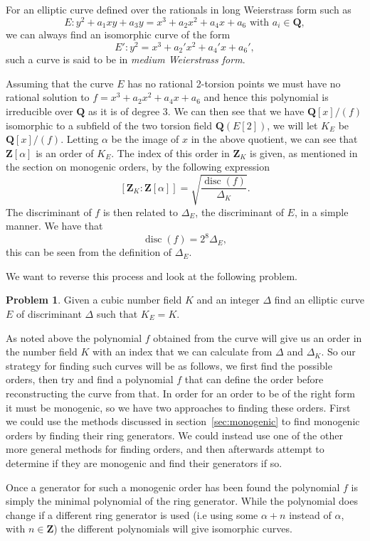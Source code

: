 \documentclass[12pt,a4paper,abstracton,bibtotoc]{scrreprt}
\theoremstyle{definition}
\newtheorem{prob}{Problem}
\newcommand{\QQ}{\mathbf{Q}}
\newcommand{\ZZ}{\mathbf{Z}}
\DeclareMathOperator{\disc}{disc}
\begin{document}
For an elliptic curve defined over the rationals in long Weierstrass form such as
\[
E \colon y^2 + a_1xy + a_3y = x^3 + a_2x^2 + a_4x + a_6\text{ with }a_i \in \QQ,
\]
we can always find an isomorphic curve of the form
\[
E' \colon y^2 = x^3 + a_2'x^2 + a_4'x + a_6',
\]
such a curve is said to be in \emph{medium Weierstrass form}.

\minisec{}
Assuming that the curve $E$ has no rational 2-torsion points we must have no rational solution to $f = x^3 + a_2x^2 + a_4x + a_6$ and hence this polynomial is irreducible over $\QQ$ as it is of degree 3.
We can then see that we have $\QQ[x]/(f)$ isomorphic to a subfield of the two torsion field $\QQ(E[2])$, we will let $K_E$ be $\QQ[x]/(f)$.
Letting $\alpha$ be the image of $x$ in the above quotient, we can see that $\ZZ[\alpha]$ is an order of $K_E$.
The index of this order in $\ZZ_K$ is given, as mentioned in the section on monogenic orders, by the following expression
\[
[\ZZ_K:\ZZ[\alpha]] = \sqrt{\frac{\disc(f)}{\Delta_K}}.
\]
The discriminant of $f$ is then related to $\Delta_E$, the discriminant of $E$, in a simple manner.
We have that
\[
\disc(f) = 2^8 \Delta_E,
\]
this can be seen from the definition of $\Delta_E$. %

We want to reverse this process and look at the following problem.

\begin{prob}
Given a cubic number field $K$ and an integer $\Delta$ find an elliptic curve $E$ of discriminant $\Delta$ such that $K_E = K$.
\end{prob}

As noted above the polynomial $f$ obtained from the curve will give us an order in the number field $K$ with an index that we can calculate from $\Delta$ and $\Delta_K$.
So our strategy for finding such curves will be as follows, we first find the possible orders, then try and find a polynomial $f$ that can define the order before reconstructing the curve from that.
In order for an order to be of the right form it must be monogenic, so we have two approaches to finding these orders.
First we could use the methods discussed in section~\ref{sec:monogenic} to find monogenic orders by finding their ring generators.
We could instead use one of the other more general methods for finding orders, and then afterwards attempt to determine if they are monogenic and find their generators if so.

Once a generator for such a monogenic order has been found the polynomial $f$ is simply the minimal polynomial of the ring generator.
While the polynomial does change if a different ring generator is used (i.e using some $\alpha + n$ instead of $\alpha$, with $n\in\ZZ$) the different polynomials will give isomorphic curves.%
\end{document}
